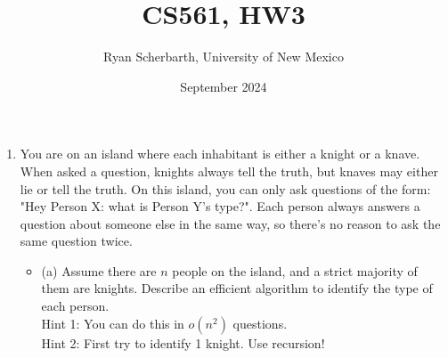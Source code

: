 \documentclass{article}
\title{CS561, HW3}
\author{Ryan Scherbarth, University of New Mexico}
\date{September 2024}
\begin{document}
\maketitle


\begin{enumerate}
\item You are on an island where each inhabitant is either a knight or a knave. When asked a question, knights always tell the truth, but knaves may either lie or tell the truth. On this island, you can only ask questions of the form: "Hey Person X: what is Person Y's type?". Each person always answers a question about someone else in the same way, so there's no reason to ask the same question twice. 

\begin{itemize}
\item (a) Assume there are $n$ people on the island, and a strict majority of them are knights. Describe an efficient algorithm to identify the type of each person. \\
Hint 1: You can do this in $o(n^{2})$ questions. \\
Hint 2: First try to identify 1 knight. Use recursion!\\
\end{itemize}

\end{enumerate}
\end{document}
